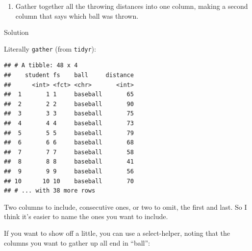 \documentclass[]{tufte-book}
\newenvironment{Shaded}{}{}
\newcommand{\DataTypeTok}[1]{\textcolor[rgb]{0.56,0.13,0.00}{#1}}
\newcommand{\KeywordTok}[1]{\textcolor[rgb]{0.00,0.44,0.13}{\textbf{#1}}}
\newcommand{\NormalTok}[1]{#1}
\newcommand{\OperatorTok}[1]{\textcolor[rgb]{0.40,0.40,0.40}{#1}}
\newcommand{\StringTok}[1]{\textcolor[rgb]{0.25,0.44,0.63}{#1}}
\providecommand{\tightlist}{%
  \setlength{\itemsep}{0pt}\setlength{\parskip}{0pt}}
\theoremstyle{definition}
\theoremstyle{definition}
\theoremstyle{definition}
\theoremstyle{remark}
\begin{document}
\begin{enumerate}
\def\labelenumi{(\alph{enumi})}
\setcounter{enumi}{2}
\tightlist
\item
  Gather together all the throwing distances into one column, making a
  second column that says which ball was thrown.
\end{enumerate}

Solution

Literally \texttt{gather} (from \texttt{tidyr}):

\begin{Shaded}
\end{Shaded}

\begin{verbatim}
## # A tibble: 48 x 4
##    student fs    ball     distance
##      <int> <fct> <chr>       <int>
##  1       1 1     baseball       65
##  2       2 2     baseball       90
##  3       3 3     baseball       75
##  4       4 4     baseball       73
##  5       5 5     baseball       79
##  6       6 6     baseball       68
##  7       7 7     baseball       58
##  8       8 8     baseball       41
##  9       9 9     baseball       56
## 10      10 10    baseball       70
## # ... with 38 more rows
\end{verbatim}

Two columns to include, consecutive ones, or two to omit, the first and
last. So I think it's easier to name the ones you want to include.

If you want to show off a little, you can use a select-helper, noting
that the columns you want to gather up all end in ``ball'':

\begin{Shaded}
\end{Shaded}
\end{document}
